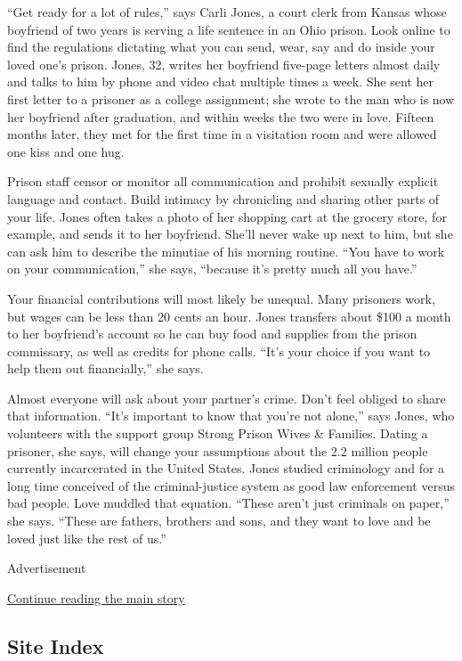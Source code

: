 ``Get ready for a lot of rules,'' says Carli Jones, a court clerk from
Kansas whose boyfriend of two years is serving a life sentence in an
Ohio prison. Look online to find the regulations dictating what you can
send, wear, say and do inside your loved one's prison. Jones, 32, writes
her boyfriend five-page letters almost daily and talks to him by phone
and video chat multiple times a week. She sent her first letter to a
prisoner as a college assignment; she wrote to the man who is now her
boyfriend after graduation, and within weeks the two were in love.
Fifteen months later, they met for the first time in a visitation room
and were allowed one kiss and one hug.

Prison staff censor or monitor all communication and prohibit sexually
explicit language and contact. Build intimacy by chronicling and sharing
other parts of your life. Jones often takes a photo of her shopping cart
at the grocery store, for example, and sends it to her boyfriend. She'll
never wake up next to him, but she can ask him to describe the minutiae
of his morning routine. ``You have to work on your communication,'' she
says, ``because it's pretty much all you have.''

Your financial contributions will most likely be unequal. Many prisoners
work, but wages can be less than 20 cents an hour. Jones transfers about
\$100 a month to her boyfriend's account so he can buy food and supplies
from the prison commissary, as well as credits for phone calls. ``It's
your choice if you want to help them out financially,'' she says.

Almost everyone will ask about your partner's crime. Don't feel obliged
to share that information. ``It's important to know that you're not
alone,'' says Jones, who volunteers with the support group Strong Prison
Wives \& Families. Dating a prisoner, she says, will change your
assumptions about the 2.2 million people currently incarcerated in the
United States. Jones studied criminology and for a long time conceived
of the criminal-justice system as good law enforcement versus bad
people. Love muddled that equation. ``These aren't just criminals on
paper,'' she says. ``These are fathers, brothers and sons, and they want
to love and be loved just like the rest of us.''

Advertisement

\protect\hyperlink{after-bottom}{Continue reading the main story}

\hypertarget{site-index}{%
\subsection{Site Index}\label{site-index}}

